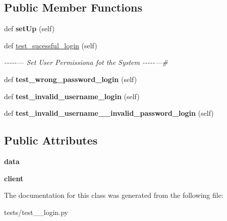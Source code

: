 \subsection*{Public Member Functions}
\begin{DoxyCompactItemize}
\item 
\mbox{\label{classtests_1_1test__5__login_1_1_test_user_routes_a1a60e73e587ad1e24703d02c913dab0a}} 
def {\bfseries set\+Up} (self)
\item 
\mbox{\label{classtests_1_1test__5__login_1_1_test_user_routes_af73cbbcc4c437f887f38969205fc0978}} 
def \hyperlink{classtests_1_1test__5__login_1_1_test_user_routes_af73cbbcc4c437f887f38969205fc0978}{test\+\_\+sucessful\+\_\+login} (self)
\begin{DoxyCompactList}\small\item\em -\/-\/-\/-\/-\/--- Set User Permissiona fot the System -\/-\/-\/-\/-\/---\# \end{DoxyCompactList}\item 
\mbox{\label{classtests_1_1test__5__login_1_1_test_user_routes_ac6b4bf9ad5f166d1cdcd371801c5371d}} 
def {\bfseries test\+\_\+wrong\+\_\+password\+\_\+login} (self)
\item 
\mbox{\label{classtests_1_1test__5__login_1_1_test_user_routes_a5d043d579b6f8497191d239cfc78b900}} 
def {\bfseries test\+\_\+invalid\+\_\+username\+\_\+login} (self)
\item 
\mbox{\label{classtests_1_1test__5__login_1_1_test_user_routes_acca8a2b3bba4b28b2e1c0485f35b1250}} 
def {\bfseries test\+\_\+invalid\+\_\+username\+\_\+\+\_\+invalid\+\_\+password\+\_\+login} (self)
\end{DoxyCompactItemize}
\subsection*{Public Attributes}
\begin{DoxyCompactItemize}
\item 
\mbox{\label{classtests_1_1test__5__login_1_1_test_user_routes_a717c6e8d6b4f325eb2bb6209a5c8dc1b}} 
{\bfseries data}
\item 
\mbox{\label{classtests_1_1test__5__login_1_1_test_user_routes_a1a2cbaae1a6bb07d1f25e5c4ea1b54e1}} 
{\bfseries client}
\end{DoxyCompactItemize}


The documentation for this class was generated from the following file\+:\begin{DoxyCompactItemize}
\item 
tests/test\+\_\+\_\+login.\+py\end{DoxyCompactItemize}
